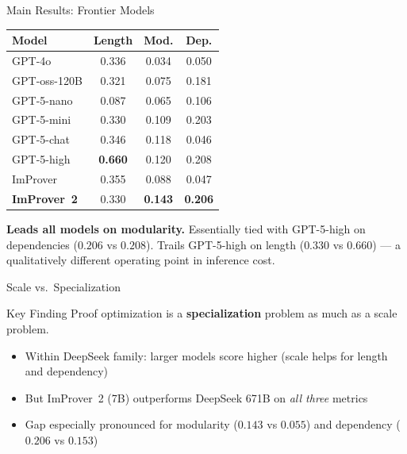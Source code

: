 \documentclass{beamer}
\newcommand{\good}[1]{\textcolor{improverGreen}{\textbf{#1}}}
\begin{document}
\begin{frame}{Main Results: Frontier Models}
\vspace{0.3em}
\begin{center}
\small
\begin{tabular}{l|ccc}
\hline
\textbf{Model} & \textbf{Length} & \textbf{Mod.} & \textbf{Dep.}\\
\hline
GPT-4o          & 0.336 & 0.034 & 0.050\\
GPT-oss-120B    & 0.321 & 0.075 & 0.181\\
GPT-5-nano      & 0.087 & 0.065 & 0.106\\
GPT-5-mini      & 0.330 & 0.109 & 0.203\\
GPT-5-chat      & 0.346 & 0.118 & 0.046\\
GPT-5-high      & \good{0.660} & 0.120 & 0.208\\
\hdashline
ImProver        & 0.355 & 0.088 & 0.047\\
\textbf{ImProver~2} & 0.330 & \good{\textbf{0.143}} & \good{0.206}\\
\hline
\end{tabular}
\end{center}
\vspace{0.3em}
\small \good{Leads all models on modularity.} Essentially tied with GPT-5-high on dependencies ($0.206$ vs $0.208$). Trails GPT-5-high on length ($0.330$ vs $0.660$) --- a qualitatively different operating point in inference cost.
\end{frame}

\begin{frame}{Scale vs.\ Specialization}
\vspace{0.4em}
\begin{block}{Key Finding}
Proof optimization is a \textbf{specialization} problem as much as a scale problem.
\end{block}
\vspace{0.5em}
\begin{itemize}\setlength{\itemsep}{8pt}
  \item Within DeepSeek family: larger models score higher (scale helps for length and dependency)
  \item But ImProver~2 (7B) outperforms DeepSeek 671B on \emph{all three} metrics
  \item Gap especially pronounced for modularity ($0.143$ vs $0.055$) and dependency ($0.206$ vs $0.153$)
\end{itemize}
\end{frame}
\end{document}
